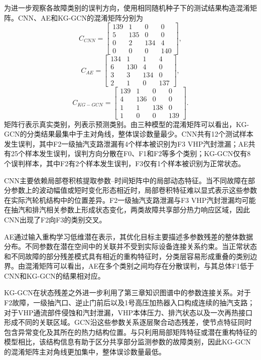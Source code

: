 为进一步观察各故障类别的误判方向，使用相同随机种子下的测试结果构造混淆矩阵。CNN、AE和KG-GCN的混淆矩阵分别为
\begin{equation}
C_{CNN}=\begin{bmatrix}
139&1&0&0\\
5&135&0&0\\
0&2&134&4\\
0&0&0&140
\end{bmatrix},
\end{equation}
\begin{equation}
C_{AE}=\begin{bmatrix}
134&1&1&4\\
6&130&4&0\\
3&3&134&0\\
2&1&0&137
\end{bmatrix},
\end{equation}
\begin{equation}
C_{KG-GCN}=\begin{bmatrix}
139&1&0&0\\
4&136&0&0\\
1&1&138&0\\
1&0&0&139
\end{bmatrix}.
\end{equation}
矩阵行表示真实类别，列表示预测类别。由三种模型的混淆矩阵可以看出，KG-GCN的分类结果最集中于主对角线，整体误诊数量最少。CNN共有12个测试样本发生误判，其中F2一级抽汽支路泄漏有4个样本被识别为F3 VHP汽封泄漏；AE共有25个样本发生误判，误判方向分散在F0、F1和F2等多个类别；KG-GCN仅有8个误判样本，其中F2有2个样本发生误判，F3仅有1个样本被识别为正常状态。

CNN主要依赖局部卷积核提取参数--时间矩阵中的局部动态特征。当不同故障在部分参数上的波动幅值或短时变化形态相近时，局部卷积特征难以显式表示这些参数在实际汽轮机结构中的位置差异。F2一级抽汽支路泄漏与F3 VHP汽封泄漏均可能在抽汽和排汽相关参数上形成状态变化，两类故障共享部分热力响应区域，因此CNN出现了F2向F3的类别交叉。

AE通过输入重构学习低维潜在表示，其优化目标主要描述多参数残差的整体数据分布。不同参数在潜在空间中的关联并不受到实际设备连接关系约束。当正常状态和不同故障的部分残差模式具有相近的重构特征时，分类层容易形成重叠的类别边界。由混淆矩阵可以看出，AE在多个类别之间均存在分散误判，与其总体F1低于CNN和KG-GCN的结果相对应。

KG-GCN在状态残差之外进一步利用了第三章知识图谱中的参数连接关系。对于F2故障，一级抽汽口、逆止门前后以及1号高压加热器入口构成连续的抽汽支路；对于VHP通流部件侵蚀和汽封泄漏，VHP本体压力、排汽状态以及一次再热接口形成不同的关联区域。GCN沿这些参数关系逐层聚合动态残差，使节点特征同时包含异常变化及其所在的热力结构位置。与只利用局部矩阵特征或潜在重构特征的模型相比，该结构信息有助于区分共享部分监测参数的故障类别，因此KG-GCN的混淆矩阵主对角线更加集中，整体误诊数量最低。

